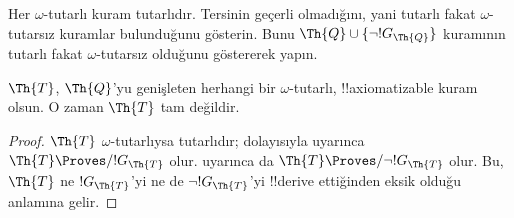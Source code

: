 \documentclass[../../../include/open-logic-section]{subfiles}
\begin{document}
\begin{prob}
  Her $\omega$-tutarlı kuram tutarlıdır. Tersinin geçerli olmadığını, yani
  tutarlı fakat $\omega$-tutarsız kuramlar bulunduğunu gösterin. Bunu
  $\Th{Q} \cup \{\lnot !G_\Th{Q}\}$ kuramının tutarlı fakat
  $\omega$-tutarsız olduğunu göstererek yapın.
\end{prob}

\begin{thm}
 $\Th{T}$, $\Th{Q}$'yu genişleten herhangi
bir $\omega$-tutarlı, !!{axiomatizable} kuram olsun. O zaman $\Th{T}$ tam
değildir.
\end{thm}

\begin{proof}
  $\Th{T}$ $\omega$-tutarlıysa tutarlıdır; dolayısıyla
   uyarınca $\Th{T} \Proves/ !G_\Th{T}$ olur.
   uyarınca da
  $\Th{T} \Proves/ \lnot !G_\Th{T}$ olur. Bu, $\Th{T}$ ne $!G_\Th{T}$'yi
  ne de $\lnot !G_\Th{T}$'yi !!{derive} ettiğinden eksik olduğu anlamına
  gelir.
\end{proof}
\end{document}

